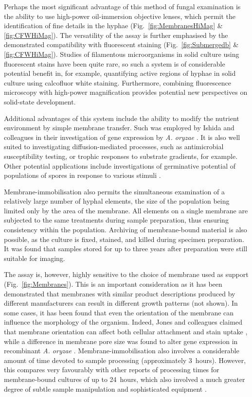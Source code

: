 Perhaps the most significant advantage of this method of fungal examination is the ability to use high-power oil-immersion objective lenses, which permit the identification of fine details in the hyphae (Fig.~\ref{fig:MembranesHiMag} \& \ref{fig:CFWHiMag}).  The versatility of the assay is further emphasised by the demonstrated compatibility with fluorescent staining (Fig.~\ref{fig:Submergedb} \& \ref{fig:CFWHiMag}). Studies of filamentous microorganisms in solid culture using fluorescent stains have been quite rare, so such a system is of considerable potential benefit in, for example, quantifying active regions of hyphae in solid culture using calcofluor white staining. Furthermore, combining fluorescence microscopy with high-power magnification provides potential new perspectives on solid-state development.

Additional advantages of this system include the ability to modify the nutrient environment by simple membrane transfer. Such was employed by Ishida and colleagues in their investigation of gene expression by \emph{A. oryzae} \cite{ishida1998}. It is also well suited to investigating diffusion-mediated processes, such as antimicrobial susceptibility testing, or trophic responses to substrate gradients, for example. Other potential applications include investigations of germinative potential of populations of spores in response to various stimuli \cite{sautour2001}.

Membrane-immobilisation also permits the simultaneous examination of a relatively large number of hyphal elements, the size of the population being limited only by the area of the membrane. All elements on a single membrane are subjected to the same treatments during sample preparation, thus ensuring consistency within the population. Archiving of membrane-bound material is also possible, as the culture is fixed, stained, and killed during specimen preparation. It was found that samples stored for up to three years after preparation were still suitable for imaging.

The assay is, however, highly sensitive to the choice of membrane used as support (Fig.~\ref{fig:Membranes}). This is an important consideration as it has been demonstrated that membranes with similar product descriptions produced by different manufacturers can result in different growth patterns (not shown). In some cases, it has been found that even the orientation of the membrane can influence the morphology of the organism. Indeed, Jones and colleagues claimed that membrane orientation can affect both cellular attachment and stain uptake \cite{jones1994}, while a difference in membrane pore size was found to alter gene expression in recombinant \emph{A. oryzae} \cite{ishida1998}. Membrane-immobilisation also involves a considerable amount of time devoted to sample processing (approximately 3~hours). However, this compares very favourably with other reports of processing times for membrane-bound cultures of up to 24~hours, which also involved a much greater degree of subtle sample manipulation and sophisticated equipment \cite{jones1994}.

